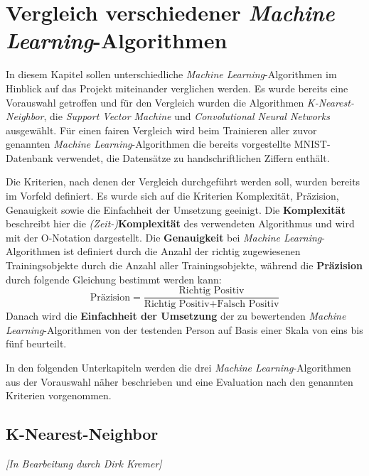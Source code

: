 \section{Vergleich verschiedener \textit{Machine Learning}-Algorithmen} \label{sec:compare}
In diesem Kapitel sollen unterschiedliche \textit{Machine Learning}-Algorithmen im Hinblick auf das Projekt miteinander verglichen werden.
Es wurde bereits eine Vorauswahl getroffen und für den Vergleich wurden die Algorithmen \textit{K-Nearest-Neighbor}, die \textit{Support Vector Machine} und
\textit{Convolutional Neural Networks} ausgewählt. Für einen fairen Vergleich wird beim Trainieren aller zuvor genannten \textit{Machine Learning}-Algorithmen
die bereits vorgestellte MNIST-Datenbank verwendet, die Datensätze zu handschriftlichen Ziffern enthält.

Die Kriterien, nach denen der Vergleich durchgeführt werden soll, wurden bereits im Vorfeld definiert. Es wurde sich auf die Kriterien Komplexität,
Präzision, Genauigkeit sowie die Einfachheit der Umsetzung geeinigt. Die \textbf{Komplexität} beschreibt hier die \textit{(Zeit-)}\textbf{Komplexität} des verwendeten Algorithmus und wird mit der O-Notation dargestellt.
Die \textbf{Genauigkeit} bei \textit{Machine Learning}-Algorithmen ist definiert durch die Anzahl der richtig zugewiesenen Trainingsobjekte durch die Anzahl aller
Trainingsobjekte, während die \textbf{Präzision} durch folgende Gleichung bestimmt werden kann:
\[ \text{Präzision} = \frac{\text{Richtig Positiv}}{\text{Richtig Positiv} + \text{Falsch Positiv}} \]
Danach wird die \textbf{Einfachheit der Umsetzung} der zu bewertenden \textit{Machine Learning}-Algorithmen von der testenden Person auf Basis einer Skala von
eins bis fünf beurteilt.

In den folgenden Unterkapiteln werden die drei \textit{Machine Learning}-Algorithmen aus der Vorauswahl näher beschrieben und eine Evaluation nach den genannten 
Kriterien vorgenommen.

\subsection{K-Nearest-Neighbor} \label{ssec:knn}
\textit{[In Bearbeitung durch Dirk Kremer]}


\newpage

